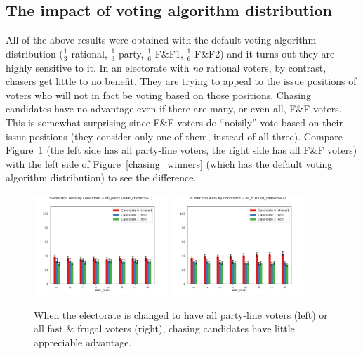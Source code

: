 \subsection{The impact of voting algorithm distribution}

All of the above results were obtained with the default voting algorithm
distribution ($\frac{1}{3}$ rational, $\frac{1}{3}$ party, $\frac{1}{6}$ F\&F1,
$\frac{1}{6}$ F\&F2) and it turns out they are highly sensitive to it. In an
electorate with \textit{no} rational voters, by contrast, chasers get little to
no benefit. They are trying to appeal to the issue positions of voters who will
not in fact be voting based on those positions. Chasing candidates have no
advantage even if there are many, or even all, F\&F voters. This is somewhat
surprising since F\&F voters do ``noisily'' vote based on their issue positions
(they consider only one of them, instead of all three). Compare
Figure~\ref{chasing_vs_distro} (the left side has all party-line voters, the
right side has all F\&F voters) with the left side of
Figure~\ref{chasing_winners} (which has the default voting algorithm
distribution) to see the difference.

\begin{figure}[ht]
\centering
\includegraphics[width=0.45\textwidth]{assets/all_party_1_chaser_no_benefit.png}
\includegraphics[width=0.45\textwidth]{assets/all_ff_chasers_no_benefit.png}
\caption{When the electorate is changed to have all party-line voters (left) or
all fast \& frugal voters (right), chasing candidates have little appreciable
advantage.}
\label{chasing_vs_distro}
\end{figure}

